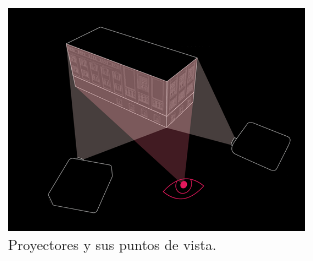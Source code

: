 \begin{figure}[H]
  \centering
    \includegraphics[width=0.7\textwidth]{./Cap2_videomapping/diagrama-2proyectores}
  \caption{Proyectores y sus puntos de vista.}%
  \label{fig:diagrama-2proyectores}
\end{figure}

